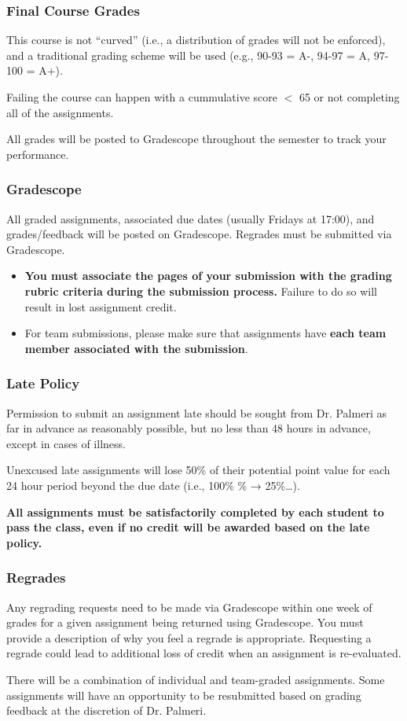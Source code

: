 \subsubsection*{Final Course Grades}
This course is not ``curved'' (i.e., a distribution of grades will not be
enforced), and a traditional grading scheme will be used (e.g., 90-93 = A-,
94-97 = A, 97-100 = A+).

Failing the course can happen with a cummulative score $<$ 65 or not completing
all of the assignments.

All grades will be posted to Gradescope throughout the semester to track your performance.

\subsubsection{Gradescope}
All graded assignments, associated due dates (usually Fridays at 17:00), and
grades/feedback will be posted on Gradescope.  Regrades must be submitted via
Gradescope.
\begin{itemize}
	\item \textbf{You must associate the pages of your submission with the
	grading rubric criteria during the submission process.}  Failure to do
	so will result in lost assignment credit.
	\item For team submissions, please make sure that assignments have
	\textbf{each team member associated with the submission}.
\end{itemize}

\subsubsection*{Late Policy}
Permission to submit an assignment late should be sought from Dr. Palmeri as
far in advance as reasonably possible, but no less than 48 hours in advance,
except in cases of illness.

Unexcused late assignments will lose 50\% of their potential point value for
each 24 hour period beyond the due date (i.e., 100\% \% → 25\%\ldots).

\textbf{All assignments must be satisfactorily completed by each student to pass
the class, even if no credit will be awarded based on the late policy.}

\subsubsection*{Regrades}
Any regrading requests need to be made via Gradescope within one week of grades for a given
assignment being returned using Gradescope. You
 must provide a description of
why you feel a regrade is appropriate. Requesting a
 regrade could lead to
additional loss of credit when an assignment is re-evaluated.

There will be a combination of individual and team-graded assignments. Some assignments will have an opportunity to be
resubmitted based on grading feedback at the discretion of Dr. Palmeri.